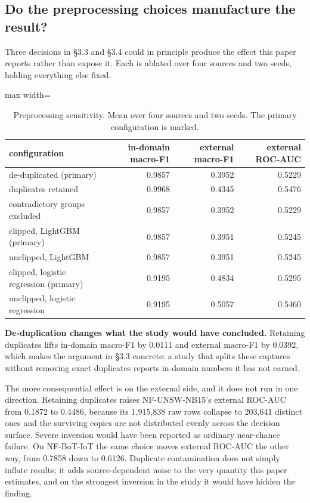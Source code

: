 \documentclass[preprint,12pt,nopreprintline]{elsarticle}
\begin{document}
\subsection{Do the preprocessing choices manufacture the result?}

Three decisions in \S{}3.3 and \S{}3.4 could in principle produce the effect this paper reports rather than expose it. Each is ablated over four sources and two seeds, holding everything else fixed.

\begin{table}[htbp]\centering\scriptsize
\caption{Preprocessing sensitivity. Mean over four sources and two seeds. The primary configuration is marked.}
\begin{adjustbox}{max width=\textwidth}\begin{tabular}{lrrr}
\toprule
configuration & in-domain macro-F1 & external macro-F1 & external ROC-AUC \\
\midrule
de-duplicated (primary) & 0.9857 & 0.3952 & 0.5229 \\
duplicates retained & 0.9968 & 0.4345 & 0.5476 \\
contradictory groups excluded & 0.9857 & 0.3952 & 0.5229 \\
clipped, LightGBM (primary) & 0.9857 & 0.3951 & 0.5245 \\
unclipped, LightGBM & 0.9857 & 0.3951 & 0.5245 \\
clipped, logistic regression (primary) & 0.9195 & 0.4834 & 0.5295 \\
unclipped, logistic regression & 0.9195 & 0.5057 & 0.5460 \\
\bottomrule
\end{tabular}\end{adjustbox}
\end{table}

\textbf{De-duplication changes what the study would have concluded.} Retaining duplicates lifts in-domain macro-F1 by 0.0111 and external macro-F1 by 0.0392, which makes the argument in \S{}3.3 concrete: a study that splits these captures without removing exact duplicates reports in-domain numbers it has not earned.

The more consequential effect is on the external side, and it does not run in one direction. Retaining duplicates raises NF-UNSW-NB15's external ROC-AUC from 0.1872 to 0.4486, because its 1,915,838 raw rows collapse to 203,641 distinct ones and the surviving copies are not distributed evenly across the decision surface. Severe inversion would have been reported as ordinary near-chance failure. On NF-BoT-IoT the same choice moves external ROC-AUC the other way, from 0.7858 down to 0.6126. Duplicate contamination does not simply inflate results; it adds source-dependent noise to the very quantity this paper estimates, and on the strongest inversion in the study it would have hidden the finding.
\end{document}
